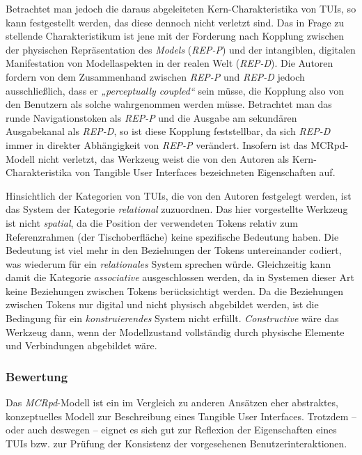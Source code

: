 Betrachtet man jedoch die daraus abgeleiteten Kern-Charakteristika von \glspl{TUI}, so kann festgestellt werden, das diese dennoch nicht verletzt sind. Das in Frage zu stellende Charakteristikum ist jene mit der Forderung nach Kopplung zwischen der physischen Repräsentation des \emph{Models} (\emph{REP-P}) und der intangiblen, digitalen Manifestation von Modellaspekten in der realen Welt (\emph{REP-D}). Die Autoren fordern von dem Zusammenhand zwischen \emph{REP-P} und \emph{REP-D} jedoch ausschließlich, dass er \emph{„perceptually coupled“} sein müsse, die Kopplung also von den Benutzern als solche wahrgenommen werden müsse. Betrachtet man das runde Navigationstoken als \emph{REP-P} und die Ausgabe am sekundären Ausgabekanal als \emph{REP-D}, so ist diese Kopplung feststellbar, da sich \emph{REP-D} immer in direkter Abhängigkeit von \emph{REP-P} verändert. Insofern ist das \gls{MCRpd}-Modell nicht verletzt, das Werkzeug weist die von den Autoren als Kern-Charakteristika von Tangible User Interfaces bezeichneten Eigenschaften auf.

Hinsichtlich der Kategorien von \glspl{TUI}, die von den Autoren festgelegt werden, ist das System der Kategorie \emph{relational} zuzuordnen. Das hier vorgestellte Werkzeug ist nicht \emph{spatial}, da die Position der verwendeten Tokens relativ zum Referenzrahmen (der Tischoberfläche) keine spezifische Bedeutung haben. Die Bedeutung ist viel mehr in den Beziehungen der Tokens untereinander codiert, was wiederum für ein \emph{relationales} System sprechen würde. Gleichzeitig kann damit die Kategorie \emph{associative} ausgeschlossen werden, da in Systemen dieser Art keine Beziehungen zwischen Tokens berücksichtigt werden. Da die Beziehungen zwischen Tokens nur digital und nicht physisch abgebildet werden, ist die Bedingung für ein \emph{konstruierendes} System nicht erfüllt. \emph{Constructive} wäre das Werkzeug dann, wenn der Modellzustand vollständig durch physische Elemente und Verbindungen abgebildet wäre.

\subsubsection{Bewertung}

Das \emph{MCRpd}-Modell ist ein im Vergleich zu anderen Ansätzen eher abstraktes, konzeptuelles Modell zur Beschreibung eines Tangible User Interfaces. Trotzdem -- oder auch deswegen -- eignet es sich gut zur Reflexion der Eigenschaften eines \glspl{TUI} bzw. zur Prüfung der Konsistenz der vorgesehenen Benutzerinteraktionen.


